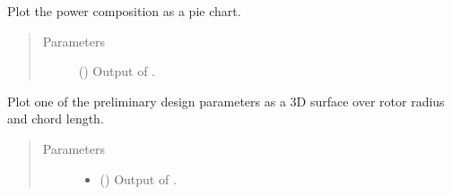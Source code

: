 \documentclass[letterpaper,10pt,english]{sphinxmanual}
\begin{document}
\begin{fulllineitems}
\begin{fulllineitems}
\begin{quote}
\begin{description}
\begin{itemize}
\end{itemize}

\end{description}\end{quote}

\end{fulllineitems}


\begin{fulllineitems}
\label{\detokenize{modules/helicopter:helicopter.Helicopter.plot_powers_pie}}
\sphinxAtStartPar
Plot the power composition as a pie chart.
\begin{quote}\begin{description}
\item[{Parameters}] \leavevmode
\sphinxAtStartPar
{} () \textendash{} Output of {\hyperref[\detokenize{modules/helicopter:helicopter.Helicopter.powers}]{}}.

\end{description}\end{quote}

\end{fulllineitems}


\begin{fulllineitems}
\label{\detokenize{modules/helicopter:helicopter.Helicopter.plot_results}}
\sphinxAtStartPar
Plot one of the preliminary design parameters as a 3D surface over
rotor radius and chord length.
\begin{quote}\begin{description}
\item[{Parameters}] \leavevmode\begin{itemize}
\item {} 
\sphinxAtStartPar
{} () \textendash{} Output of {\hyperref[\detokenize{modules/helicopter:helicopter.Helicopter.preliminary_design}]{}}.


\end{itemize}
\end{description}
\end{quote}
\end{fulllineitems}
\end{fulllineitems}
\end{document}
